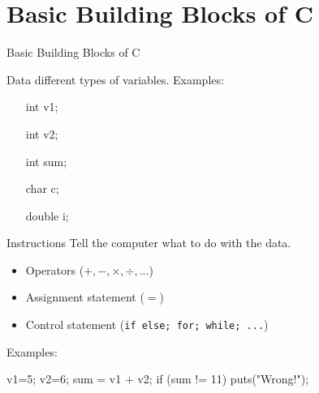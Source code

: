 \mode*
\section{Basic Building Blocks of C}

\begin{frame}[fragile]{Basic Building Blocks of C}
  \begin{iblock}{Data}
    different \alert{types} of \alert{variables}. Examples:\ttfamily
    \begin{multicols}{3}
      \begin{itemize}
      \item[int] v1;
      \item[int] v2;
      \item[int] sum;
      \item[char] c;
      \item[double] i;
      \end{itemize}
    \end{multicols}
  \end{iblock}
  \begin{iblock}{Instructions}
    Tell the computer what to do with the data.
    \begin{multicols}{2}
      \begin{itemize}
      \item Operators ($+, -, \times{}, \div{}, ...$)
      \item Assignment statement ($=$)
      \item Control statement (\texttt{if else; for; while; ...})
      \end{itemize}
    \end{multicols}
  \end{iblock}
  Examples:
  \begin{center}
\begin{ccode}
v1=5; v2=6;
sum = v1 + v2;
if (sum != 11) puts("Wrong!");
\end{ccode}    
  \end{center}
\end{frame}

